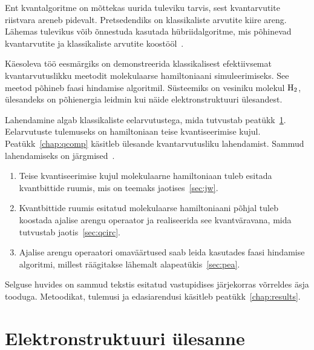 \documentclass[12pt]{report}
\begin{document}
Ent kvantalgoritme on mõttekas uurida tuleviku tarvis, sest kvantarvutite riistvara areneb pidevalt.
Pretsedendiks on klassikaliste arvutite kiire areng.
Lähemas tulevikus võib õnnestuda kasutada hübriidalgoritme, mis põhinevad kvantarvutite ja klassikaliste arvutite koostööl~\cite{omalley+etal}.

Käesoleva töö eesmärgiks on demonstreerida klassikalisest efektiivsemat kvantarvutuslikku meetodit molekulaarse hamiltoniaani simuleerimiseks.
See meetod põhineb faasi hindamise algoritmil.
Süsteemiks on vesiniku molekul \(\rm H_2\), ülesandeks on põhienergia leidmin kui näide elektronstruktuuri ülesandest.

Lahendamine algab klassikaliste eelarvutustega, mida tutvustab peatükk~\ref{chap:qchem}.
Eelarvutuste tulemuseks on hamiltoniaan teise kvantiseerimise kujul.
Peatükk~\ref{chap:qcomp} käsitleb ülesande kvantarvutusliku lahendamist.
Sammud lahendamiseks on järgmised~\cite{whitfield+etal2011}.

\begin{enumerate}
    \item Teise kvantiseerimise kujul molekulaarne hamiltoniaan tuleb esitada kvantbittide ruumis, mis on teemaks jaotises~\ref{sec:jw}.
    \item Kvantbittide ruumis esitatud molekulaarse hamiltoniaani põhjal tuleb koostada ajalise arengu operaator ja realiseerida see kvantväravana, mida tutvustab jaotis~\ref{sec:qcirc}.
    \item Ajalise arengu operaatori omaväärtused saab leida kasutades faasi hindamise algoritmi, millest räägitakse lähemalt alapeatükis~\ref{sec:pea}.
\end{enumerate}
Selguse huvides on sammud tekstis esitatud vastupidises järjekorras võrreldes äsja tooduga.
Metoodikat, tulemusi ja edasiarendusi käsitleb peatükk~\ref{chap:results}.

\chapter{Elektronstruktuuri ülesanne}\label{chap:qchem}
\end{document}
